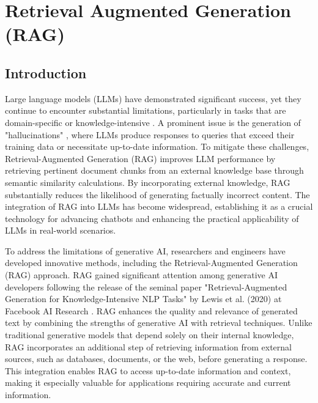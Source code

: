 \section{Retrieval Augmented Generation (RAG)}

\subsection{Introduction}

Large language models (LLMs) have demonstrated significant success, yet they continue to encounter substantial limitations, particularly in tasks that are domain-specific or knowledge-intensive \cite{kandpal2023large}. A prominent issue is the generation of "hallucinations" \cite{zhang2023sirens}, where LLMs produce responses to queries that exceed their training data or necessitate up-to-date information. To mitigate these challenges, Retrieval-Augmented Generation (RAG) improves LLM performance by retrieving pertinent document chunks from an external knowledge base through semantic similarity calculations. By incorporating external knowledge, RAG substantially reduces the likelihood of generating factually incorrect content. The integration of RAG into LLMs has become widespread, establishing it as a crucial technology for advancing chatbots and enhancing the practical applicability of LLMs in real-world scenarios.

To address the limitations of generative AI, researchers and engineers have developed innovative methods, including the Retrieval-Augmented Generation (RAG) approach. RAG gained significant attention among generative AI developers following the release of the seminal paper "Retrieval-Augmented Generation for Knowledge-Intensive NLP Tasks" by Lewis et al. (2020) at Facebook AI Research  \cite{lewis2021retrievalaugmented}. RAG enhances the quality and relevance of generated text by combining the strengths of generative AI with retrieval techniques. Unlike traditional generative models that depend solely on their internal knowledge, RAG incorporates an additional step of retrieving information from external sources, such as databases, documents, or the web, before generating a response. This integration enables RAG to access up-to-date information and context, making it especially valuable for applications requiring accurate and current information.

